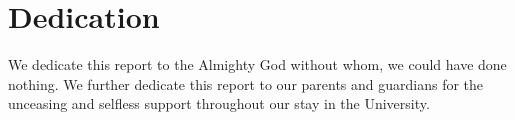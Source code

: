 \chapter*{Dedication}
 We dedicate this report to the
Almighty God without whom, we could have done nothing. We further dedicate this
report to our parents and guardians for the unceasing and selfless support
throughout our stay in the University.
